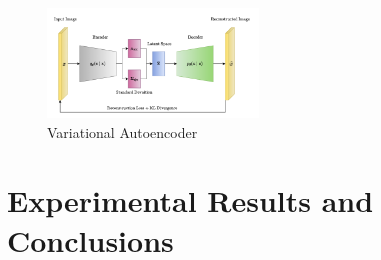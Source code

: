 \documentclass[10pt,a4paper]{article}
\begin{document}
\begin{figure}[h]
    \centering
    \includegraphics[width=0.5\textwidth]{vae.png}
    \caption{Variational Autoencoder}
    \label{fig:my_label}
\end{figure}

\section{Experimental Results and Conclusions}
\end{document}
